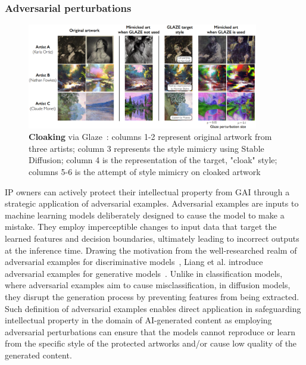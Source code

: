\documentclass[conference]{IEEEtran}
\begin{document}

\subsubsection{Adversarial perturbations}\label{sec:mitigation-adversarial} %

\begin{figure}[ht]
    \centering
    \includegraphics[width=0.9\textwidth]{figures/glaze.PNG}
    \caption{\textbf{Cloaking} via Glaze~\cite{shan_glaze_2023}: columns 1-2 represent original artwork from three artists; column 3 represents the style mimicry using Stable Diffusion; column 4 is the representation of the target, "cloak" style; columns 5-6 is the attempt of style mimicry on cloaked artwork}
    \label{fig:cloaking}
\end{figure}
IP owners can actively protect their intellectual property from GAI through a strategic application of adversarial examples. 
Adversarial examples are inputs to machine learning models deliberately designed to cause the model to make a mistake. 
They employ imperceptible changes to input data that target the learned features and decision boundaries, ultimately leading to incorrect outputs at the inference time. 
Drawing the motivation from the well-researched realm of adversarial examples for discriminative models~\cite{goodfellow_explaining_2015,zhang_adversarial_2020}, %
Liang et al. introduce adversarial examples for generative models~\cite{liang_adversarial_2023}.
Unlike in classification models, where adversarial examples aim to cause misclassification, in diffusion models, they disrupt the generation process by preventing features from being extracted. 
 Such definition of adversarial examples enables direct application in safeguarding intellectual property in the domain of AI-generated content as employing adversarial perturbations can ensure that the models cannot reproduce or learn from the specific style of the protected artworks and/or cause low quality of the generated content. 
\end{document}
